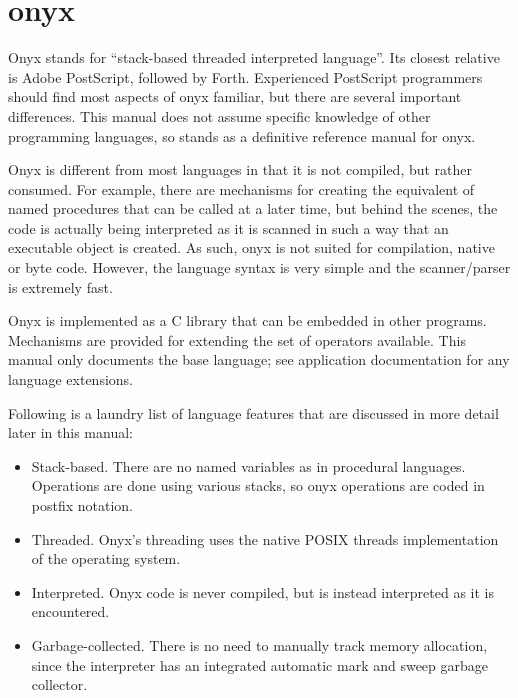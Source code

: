 %
%
%
%
%              

\clearemptydoublepage
\chapter{onyx}
\label{onyxlang}

Onyx stands for ``stack-based threaded interpreted language''.  Its closest
relative is Adobe PostScript, followed by Forth.  Experienced PostScript
programmers should find most aspects of onyx familiar, but there are several
important differences.  This manual does not assume specific knowledge of other
programming languages, so stands as a definitive reference manual for onyx.

Onyx is different from most languages in that it is not compiled, but rather
consumed.  For example, there are mechanisms for creating the equivalent of
named procedures that can be called at a later time, but behind the scenes, the
code is actually being interpreted as it is scanned in such a way that an
executable object is created.  As such, onyx is not suited for compilation,
native or byte code.  However, the language syntax is very simple and the
scanner/parser is extremely fast.

Onyx is implemented as a C library that can be embedded in other programs.
Mechanisms are provided for extending the set of operators available.  This
manual only documents the base language; see application documentation for any
language extensions.

Following is a laundry list of language features that are discussed in more
detail later in this manual:

\begin{itemize}
\item{Stack-based.  There are no named variables as in procedural languages.
Operations are done using various stacks, so onyx operations are coded in
postfix notation.}
\item{Threaded.  Onyx's threading uses the native POSIX threads implementation
of the operating system.}
\item{Interpreted.  Onyx code is never compiled, but is instead interpreted as
it is encountered.}
\item{Garbage-collected.  There is no need to manually track memory allocation,
since the interpreter has an integrated automatic mark and sweep garbage
collector.}
\end{itemize}

